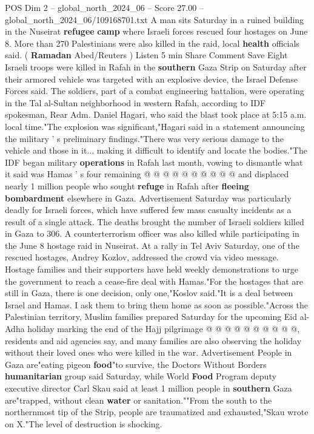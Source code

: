 \begin{textsample}{POS Dim 2 – global\_north\_2024\_06 – Score 27.00 – global\_north\_2024\_06/109168701.txt}  \label{ex:f2_pos_259}
A man sits Saturday in a ruined building in the Nuseirat \textbf{refugee} \textbf{camp} where Israeli forces rescued four hostages on June 8.
More than 270 Palestinians were also killed in the raid, local \textbf{health} officials said. ( \textbf{Ramadan} Abed/Reuters ) Listen 5 min Share Comment Save Eight Israeli troops were killed in Rafah in the \textbf{southern} Gaza Strip on Saturday after their armored vehicle was targeted with an explosive device, the Israel Defense Forces said.
The soldiers, part of a combat engineering battalion, were operating in the Tal al-Sultan neighborhood in western Rafah, according to IDF spokesman, Rear Adm.
Daniel Hagari, who said the blast took place at 5:15 a.m. local time."The explosion was significant,"Hagari said in a statement announcing the military ' s preliminary findings."There was very serious damage to the vehicle and those in it... making it difficult to identify and locate the bodies."The IDF began military \textbf{operations} in Rafah last month, vowing to dismantle what it said was Hamas ' s four remaining @ @ @ @ @ @ @ @ @ @ and displaced nearly 1 million people who sought \textbf{refuge} in Rafah after \textbf{fleeing} \textbf{bombardment} elsewhere in Gaza.
Advertisement Saturday was particularly deadly for Israeli forces, which have suffered few mass casualty incidents as a result of a single attack.
The deaths brought the number of Israeli soldiers killed in Gaza to 306.
A counterterrorism officer was also killed while participating in the June 8 hostage raid in Nuseirat.
At a rally in Tel Aviv Saturday, one of the rescued hostages, Andrey Kozlov, addressed the crowd via video message.
Hostage families and their supporters have held weekly demonstrations to urge the government to reach a cease-fire deal with Hamas."For the hostages that are still in Gaza, there is one decision, only one,"Koslov said."It is a deal between Israel and Hamas.
I ask them to bring them home as soon as possible."Across the Palestinian territory, Muslim families prepared Saturday for the upcoming Eid al-Adha holiday marking the end of the Hajj pilgrimage @ @ @ @ @ @ @ @ @ @, residents and aid agencies say, and many families are also observing the holiday without their loved ones who were killed in the war.
Advertisement People in Gaza are"eating pigeon \textbf{food}"to survive, the Doctors Without Borders \textbf{humanitarian} group said Saturday, while World \textbf{Food} Program deputy executive director Carl Skau said at least 1 million people in \textbf{southern} Gaza are"trapped, without clean \textbf{water} or sanitation.""From the south to the northernmost tip of the Strip, people are traumatized and exhausted,"Skau wrote on X."The level of destruction is shocking.

\end{textsample}

